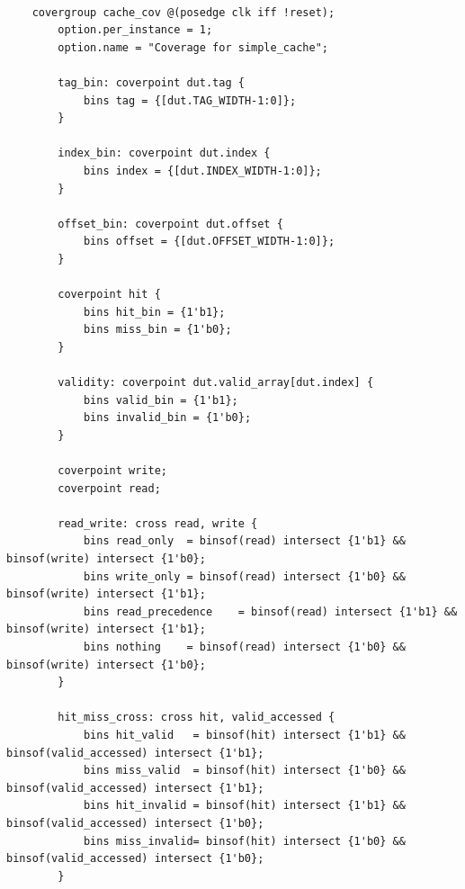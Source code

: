 \documentclass{article}
\begin{document}
\begin{verbatim}

    covergroup cache_cov @(posedge clk iff !reset);
        option.per_instance = 1;
        option.name = "Coverage for simple_cache";

        tag_bin: coverpoint dut.tag {
            bins tag = {[dut.TAG_WIDTH-1:0]};
        } 

        index_bin: coverpoint dut.index {
            bins index = {[dut.INDEX_WIDTH-1:0]};
        }

        offset_bin: coverpoint dut.offset {
            bins offset = {[dut.OFFSET_WIDTH-1:0]};
        }

        coverpoint hit {
            bins hit_bin = {1'b1};
            bins miss_bin = {1'b0};
        }

        validity: coverpoint dut.valid_array[dut.index] {
            bins valid_bin = {1'b1};
            bins invalid_bin = {1'b0};
        }

        coverpoint write;
        coverpoint read;

        read_write: cross read, write {
            bins read_only  = binsof(read) intersect {1'b1} && binsof(write) intersect {1'b0};
            bins write_only = binsof(read) intersect {1'b0} && binsof(write) intersect {1'b1};
            bins read_precedence    = binsof(read) intersect {1'b1} && binsof(write) intersect {1'b1};
            bins nothing    = binsof(read) intersect {1'b0} && binsof(write) intersect {1'b0};
        }

        hit_miss_cross: cross hit, valid_accessed {
            bins hit_valid   = binsof(hit) intersect {1'b1} && binsof(valid_accessed) intersect {1'b1};
            bins miss_valid  = binsof(hit) intersect {1'b0} && binsof(valid_accessed) intersect {1'b1};
            bins hit_invalid = binsof(hit) intersect {1'b1} && binsof(valid_accessed) intersect {1'b0};
            bins miss_invalid= binsof(hit) intersect {1'b0} && binsof(valid_accessed) intersect {1'b0};
        }


\end{verbatim}
\end{document}
